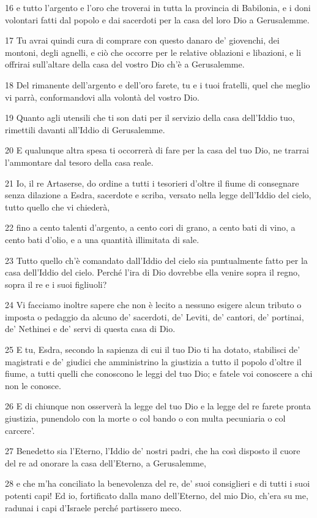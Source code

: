 \par 16 e tutto l'argento e l'oro che troverai in tutta la provincia di Babilonia, e i doni volontari fatti dal popolo e dai sacerdoti per la casa del loro Dio a Gerusalemme.
\par 17 Tu avrai quindi cura di comprare con questo danaro de' giovenchi, dei montoni, degli agnelli, e ciò che occorre per le relative oblazioni e libazioni, e li offrirai sull'altare della casa del vostro Dio ch'è a Gerusalemme.
\par 18 Del rimanente dell'argento e dell'oro farete, tu e i tuoi fratelli, quel che meglio vi parrà, conformandovi alla volontà del vostro Dio.
\par 19 Quanto agli utensili che ti son dati per il servizio della casa dell'Iddio tuo, rimettili davanti all'Iddio di Gerusalemme.
\par 20 E qualunque altra spesa ti occorrerà di fare per la casa del tuo Dio, ne trarrai l'ammontare dal tesoro della casa reale.
\par 21 Io, il re Artaserse, do ordine a tutti i tesorieri d'oltre il fiume di consegnare senza dilazione a Esdra, sacerdote e scriba, versato nella legge dell'Iddio del cielo, tutto quello che vi chiederà,
\par 22 fino a cento talenti d'argento, a cento cori di grano, a cento bati di vino, a cento bati d'olio, e a una quantità illimitata di sale.
\par 23 Tutto quello ch'è comandato dall'Iddio del cielo sia puntualmente fatto per la casa dell'Iddio del cielo. Perché l'ira di Dio dovrebbe ella venire sopra il regno, sopra il re e i suoi figliuoli?
\par 24 Vi facciamo inoltre sapere che non è lecito a nessuno esigere alcun tributo o imposta o pedaggio da alcuno de' sacerdoti, de' Leviti, de' cantori, de' portinai, de' Nethinei e de' servi di questa casa di Dio.
\par 25 E tu, Esdra, secondo la sapienza di cui il tuo Dio ti ha dotato, stabilisci de' magistrati e de' giudici che amministrino la giustizia a tutto il popolo d'oltre il fiume, a tutti quelli che conoscono le leggi del tuo Dio; e fatele voi conoscere a chi non le conosce.
\par 26 E di chiunque non osserverà la legge del tuo Dio e la legge del re farete pronta giustizia, punendolo con la morte o col bando o con multa pecuniaria o col carcere'.
\par 27 Benedetto sia l'Eterno, l'Iddio de' nostri padri, che ha così disposto il cuore del re ad onorare la casa dell'Eterno, a Gerusalemme,
\par 28 e che m'ha conciliato la benevolenza del re, de' suoi consiglieri e di tutti i suoi potenti capi! Ed io, fortificato dalla mano dell'Eterno, del mio Dio, ch'era su me, radunai i capi d'Israele perché partissero meco.


